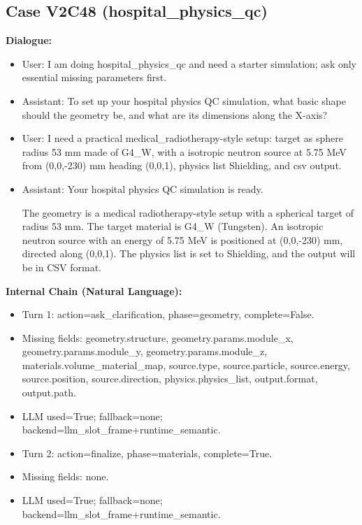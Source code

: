 \documentclass[11pt]{ctexart}
\begin{document}
\subsection{Case V2C48 (hospital\_physics\_qc)}
\textbf{Dialogue:}
\begin{itemize}
\item User: I am doing hospital\_physics\_qc and need a starter simulation; ask only essential missing parameters first.
\item Assistant: To set up your hospital physics QC simulation, what basic shape should the geometry be, and what are its dimensions along the X-axis?
\item User: I need a practical medical\_radiotherapy-style setup: target as sphere radius 53 mm made of G4\_W, with a isotropic neutron source at 5.75 MeV from (0,0,-230) mm heading (0,0,1), physics list Shielding, and csv output.
\item Assistant: Your hospital physics QC simulation is ready.

The geometry is a medical radiotherapy-style setup with a spherical target of radius 53 mm. The target material is G4\_W (Tungsten). An isotropic neutron source with an energy of 5.75 MeV is positioned at (0,0,-230) mm, directed along (0,0,1). The physics list is set to Shielding, and the output will be in CSV format.
\end{itemize}
\textbf{Internal Chain (Natural Language):}
\begin{itemize}
\item Turn 1: action=ask\_clarification, phase=geometry, complete=False.
\item Missing fields: geometry.structure, geometry.params.module\_x, geometry.params.module\_y, geometry.params.module\_z, materials.volume\_material\_map, source.type, source.particle, source.energy, source.position, source.direction, physics.physics\_list, output.format, output.path.
\item LLM used=True; fallback=none; backend=llm\_slot\_frame+runtime\_semantic.
\item Turn 2: action=finalize, phase=materials, complete=True.
\item Missing fields: none.
\item LLM used=True; fallback=none; backend=llm\_slot\_frame+runtime\_semantic.
\end{itemize}
\end{document}
